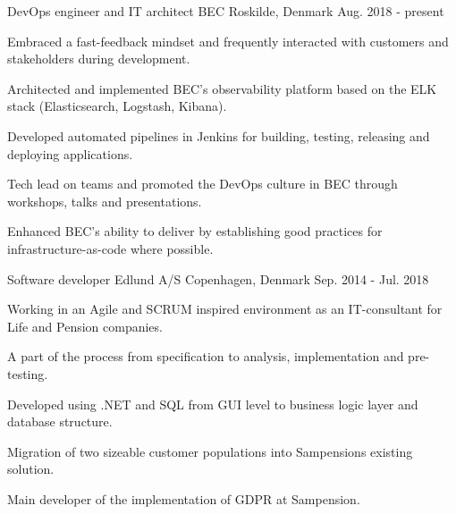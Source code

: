 


\begin{cventries}

\cventry
{DevOps engineer and IT architect} %
{BEC} %
{Roskilde, Denmark} %
{Aug. 2018 - present } %
{ %
\begin{cvitems}
\item{Embraced a fast-feedback mindset and frequently interacted with customers and stakeholders during development.}
\item Architected and implemented BEC's observability platform based on the ELK stack (Elasticsearch, Logstash, Kibana).
\item Developed automated pipelines in Jenkins for building, testing, releasing and deploying applications.
\item Tech lead on teams and promoted the DevOps culture in BEC through workshops, talks and presentations.
\item Enhanced BEC's ability to deliver by establishing good practices for infrastructure-as-code where possible.
\end{cvitems}
}
\cventry
{Software developer} %
{Edlund A/S} %
{Copenhagen, Denmark} %
{Sep. 2014 - Jul. 2018 } %
{ %
\begin{cvitems}
\item {Working in an Agile and SCRUM inspired environment as an IT-consultant for Life and Pension companies.}
\item {A part of the process from specification to analysis, implementation and pre-testing.}
\item {Developed using .NET and SQL from GUI level to business logic layer and database structure.}
\item {Migration of two sizeable customer populations into Sampensions existing solution.}
\item {Main developer of the implementation of GDPR at Sampension.}
\end{cvitems}
}


\end{cventries}
